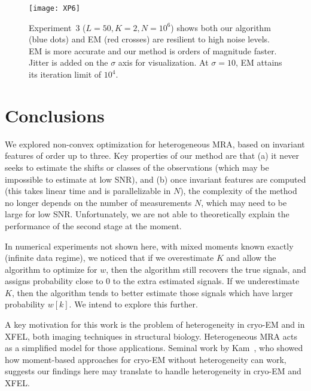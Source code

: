 \documentclass[english]{article}
\numberwithin{equation}{section}
\numberwithin{figure}{section}
\theoremstyle{plain}
\theoremstyle{definition}
\theoremstyle{remark}
\theoremstyle{plain}
\theoremstyle{remark}
\theoremstyle{plain}
\theoremstyle{plain}
\begin{document}
\begin{figure}[t]
	\begin{center}
		\texttt{[image: XP6]}
		\caption{Experiment~3 ($L = 50, K = 2, N = 10^6$) shows both our algorithm (blue dots) and EM (red crosses) are resilient to high noise levels. EM is more accurate and our method is orders of magnitude faster. Jitter is added on the $\sigma$ axis for visualization. At $\sigma = 10$, EM attains its iteration limit of $10^4$.}
		\label{fig:XP3}
	\end{center}
\end{figure}







\section{Conclusions}\label{sec:conclusions}

We explored non-convex optimization for heterogeneous MRA, based on invariant features of order up to three. Key properties of our method are that (a) it never seeks to estimate the shifts or classes of the observations (which may be impossible to estimate at low SNR), and (b) once invariant features are computed (this takes linear time and is parallelizable in $N$), the complexity of the method no longer depends on the number of measurements $N$, which may need to be large for low SNR. Unfortunately, we are not able to theoretically explain the performance of the second stage at the moment.


In numerical experiments not shown here, with mixed moments known exactly (infinite data regime), we noticed that if we overestimate $K$ and allow the algorithm to optimize for $w$, then the algorithm still recovers the true signals, and assigns probability close to 0 to the extra estimated signals. If we underestimate $K$, then the algorithm tends to better estimate those signals which have larger probability $w[k]$. We intend to explore this further.


A key motivation for this work is the problem of heterogeneity in cryo-EM and in XFEL, both imaging techniques in structural biology. Heterogeneous MRA acts as a simplified model for those applications. Seminal work by Kam~\cite{kam1980reconstruction}, who showed how moment-based approaches for cryo-EM without heterogeneity can work, suggests our findings here may translate to handle heterogeneity in cryo-EM and XFEL.
\end{document}
